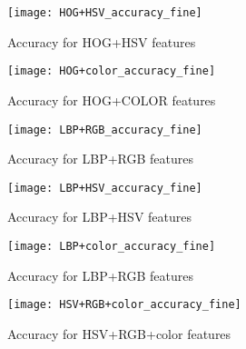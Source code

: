 \FloatBarrier
\begin{figure}[!tbp]
	\begin{minipage}[b]{0.4\textwidth}
		\texttt{[image: HOG+HSV\_accuracy\_fine]}
		\caption{Accuracy for HOG+HSV features}
	\end{minipage}
	\hfill
	\begin{minipage}[b]{0.4\textwidth}
		\texttt{[image: HOG+color\_accuracy\_fine]}
		\caption{Accuracy for HOG+COLOR features}
	\end{minipage}
\end{figure}
\FloatBarrier


\FloatBarrier
\begin{figure}[!tbp]
	\begin{minipage}[b]{0.4\textwidth}
		\texttt{[image: LBP+RGB\_accuracy\_fine]}
		\caption{Accuracy for LBP+RGB features}
	\end{minipage}
	\hfill
	\begin{minipage}[b]{0.4\textwidth}
		\texttt{[image: LBP+HSV\_accuracy\_fine]}
		\caption{Accuracy for LBP+HSV features}
	\end{minipage}
\end{figure}
\FloatBarrier

\FloatBarrier
\begin{figure}[!tbp]
	\begin{minipage}[b]{0.4\textwidth}
		\texttt{[image: LBP+color\_accuracy\_fine]}
		\caption{Accuracy for LBP+RGB features}
	\end{minipage}
	\hfill
	\begin{minipage}[b]{0.4\textwidth}
		\texttt{[image: HSV+RGB+color\_accuracy\_fine]}
		\caption{Accuracy for HSV+RGB+color features}
	\end{minipage}
\end{figure}
\FloatBarrier